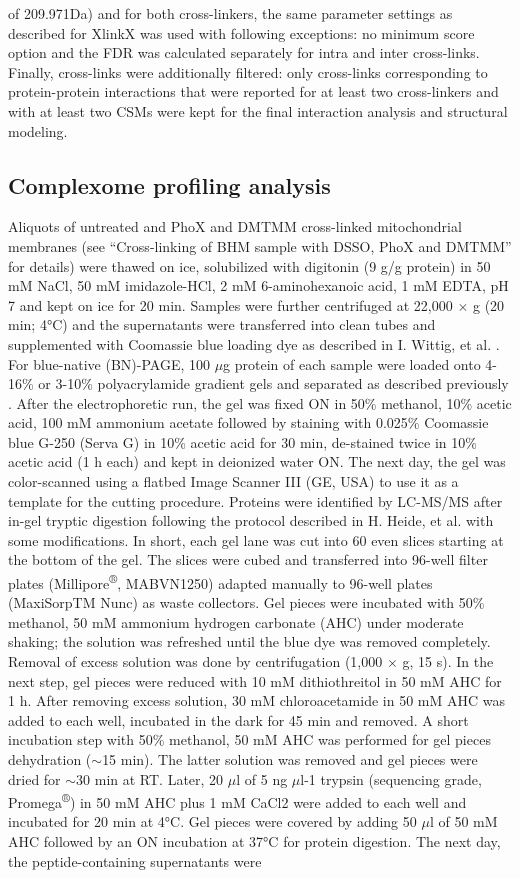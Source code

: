 of 209.971Da) and for both cross-linkers, the same parameter settings as described for XlinkX was used with following exceptions: no minimum score option and the FDR was calculated separately for intra and inter cross-links. Finally, cross-links were additionally filtered: only cross-links corresponding to protein-protein interactions that were reported for at least two cross-linkers and with at least two CSMs were kept for the final interaction analysis and structural modeling.
%
\subsection*{Complexome profiling analysis}
Aliquots of untreated and PhoX and DMTMM cross-linked mitochondrial membranes (see “Cross-linking of BHM sample with DSSO, PhoX and DMTMM” for details) were thawed on ice, solubilized with digitonin (9 g/g protein) in 50 mM NaCl, 50 mM imidazole-HCl, 2 mM 6-aminohexanoic acid, 1 mM EDTA, pH 7 and kept on ice for 20 min. Samples were further centrifuged at 22,000 $\times$ g (20 min; 4°C) and the supernatants were transferred into clean tubes and supplemented with Coomassie blue loading dye as described in I. Wittig, et al. \cite{RN66}. For blue-native (BN)-PAGE, 100 $\mu$g protein of each sample were loaded onto 4-16\% or 3-10\% polyacrylamide gradient gels and separated as described previously \cite{RN66}. After the electrophoretic run, the gel was fixed ON in 50\% methanol, 10\% acetic acid, 100 mM ammonium acetate followed by staining with 0.025\% Coomassie blue G-250 (Serva G) in 10\% acetic acid for 30 min, de-stained twice in 10\% acetic acid (1 h each) and kept in deionized water ON. The next day, the gel was color-scanned using a flatbed Image Scanner III (GE, USA) to use it as a template for the cutting procedure. Proteins were identified by LC-MS/MS after in-gel tryptic digestion following the protocol described in H. Heide, et al. \cite{RN15} with some modifications. In short, each gel lane was cut into 60 even slices starting at the bottom of the gel. The slices were cubed and transferred into 96-well filter plates (Millipore\textsuperscript{®}, MABVN1250) adapted manually to 96-well plates (MaxiSorpTM Nunc) as waste collectors. Gel pieces were incubated with 50\% methanol, 50 mM ammonium hydrogen carbonate (AHC) under moderate shaking; the solution was refreshed until the blue dye was removed completely. Removal of excess solution was done by centrifugation (1,000 $\times$ g, 15 s). In the next step, gel pieces were reduced with 10 mM dithiothreitol in 50 mM AHC for 1 h. After removing excess solution, 30 mM chloroacetamide in 50 mM AHC was added to each well, incubated in the dark for 45 min and removed. A short incubation step with 50\% methanol, 50 mM AHC was performed for gel pieces dehydration ($\sim$15 min). The latter solution was removed and gel pieces were dried for $\sim$30 min at RT. Later, 20 $\mu$l of 5 ng $\mu$l-1 trypsin (sequencing grade, Promega\textsuperscript{®}) in 50 mM AHC plus 1 mM CaCl2 were added to each well and incubated for 20 min at 4°C. Gel pieces were covered by adding 50 $\mu$l of 50 mM AHC followed by an ON incubation at 37°C for protein digestion. The next day, the peptide-containing supernatants were 